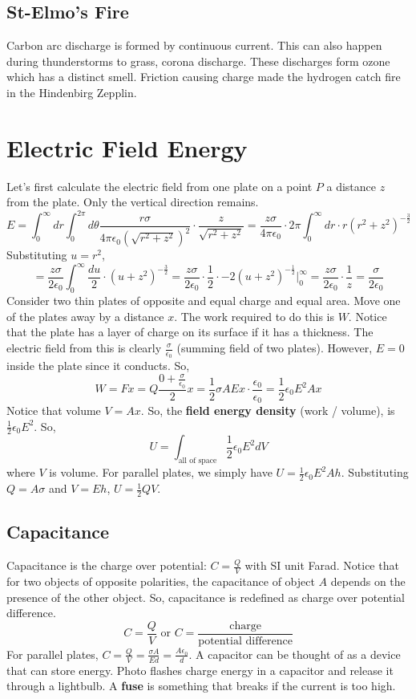 \documentclass{article}
\begin{document}
\subsection{St-Elmo's Fire}
Carbon arc discharge is formed by continuous current. This can also happen during thunderstorms to grass, corona discharge.
These discharges form ozone which has a distinct smell. Friction causing charge made the hydrogen catch fire in the Hindenbirg Zepplin.

\section{Electric Field Energy}
Let's first calculate the electric field from one plate on a point $P$ a distance $z$ 
from the plate. Only the vertical direction remains.
$$E=\int_{0}^{\infty}dr\int_{0}^{2\pi}d\theta
\frac{r\sigma}{4\pi \epsilon_{0}\left(\sqrt{r^{2}+z^{2}}\right)^{2}}\cdot \frac{z}{\sqrt{r^{2}+z^{2}}}
=\frac{z\sigma}{4\pi \epsilon_{0}}\cdot 2\pi \int_{0}^{\infty}dr\cdot 
r(r^{2}+z^{2})^{-\frac{3}{2}}$$
Substituting $u=r^{2}$,
$$=\frac{z\sigma}{2\epsilon_{0}}\int_{0}^{\infty}\frac{du}{2}\cdot (u+z^{2})^{-\frac{3}{2}}
=\frac{z\sigma}{2\epsilon_{0}}\cdot \frac{1}{2}\cdot -2(u+z^{2})^{-\frac{1}{2}}\biggr\vert_{0}^{\infty}
=\frac{z\sigma}{2\epsilon_{0}}\cdot\frac{1}{z}=\frac{\sigma}{2\epsilon_{0}}$$
Consider two thin plates of opposite and equal charge and equal area. 
Move one of the plates away by a distance $x$. The work required to do this
is $W$. Notice that the plate has a layer of charge on its surface if it has a thickness.
The electric field from this is clearly $\frac{\sigma}{\epsilon_0}$ (summing field of two plates). However, $E=0$ inside
the plate since it conducts. So,
$$W=Fx=Q\frac{0+\frac{\sigma}{\epsilon_0}}{2}x
=\frac{1}{2}\sigma AEx\cdot \frac{\epsilon_{0}}{\epsilon_0}
=\frac{1}{2}\epsilon_{0}E^{2}Ax$$
Notice that volume $V=Ax$. So, the \textbf{field energy density} (work / volume),
is $\frac{1}{2}\epsilon_{0}E^{2}$. So,
$$U=\int_{\text{all of space}}\frac{1}{2}\epsilon_{0}E^{2}dV$$
where $V$ is volume. For parallel plates, we simply have $U=\frac{1}{2}\epsilon_{0}E^{2}Ah$.
Substituting $Q=A\sigma$ and $V=Eh$, $U=\frac{1}{2}QV$.

\subsection{Capacitance}
Capacitance is the charge over potential: $C=\frac{Q}{V}$ with SI unit Farad.
Notice that for two objects of opposite polarities, the capacitance of object $A$
depends on the presence of the other object. So, capacitance is redefined as charge 
over potential difference.
$$C=\frac{Q}{V}\text{ or } C=\frac{\text{charge}}{\text{potential difference}}$$
For parallel plates, $C=\frac{Q}{V}=\frac{\sigma A}{Ed}=\frac{A\epsilon_{0}}{d}$.
A capacitor can be thought of as a device that can store energy. Photo flashes charge energy 
in a capacitor and release it through a lightbulb. A \textbf{fuse} is something that breaks if the 
current is too high.
\end{document}

